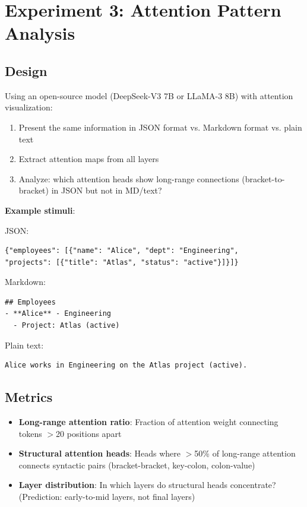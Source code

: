 \documentclass[11pt,a4paper]{article}
\begin{document}
\section{Experiment 3: Attention Pattern Analysis}

\subsection{Design}

Using an open-source model (DeepSeek-V3 7B or LLaMA-3 8B) with attention visualization:

\begin{enumerate}
    \item Present the same information in JSON format vs. Markdown format vs. plain text
    \item Extract attention maps from all layers
    \item Analyze: which attention heads show long-range connections (bracket-to-bracket) in JSON but not in MD/text?
\end{enumerate}

\textbf{Example stimuli}:

JSON:
\begin{lstlisting}
{"employees": [{"name": "Alice", "dept": "Engineering",
"projects": [{"title": "Atlas", "status": "active"}]}]}
\end{lstlisting}

Markdown:
\begin{lstlisting}
## Employees
- **Alice** - Engineering
  - Project: Atlas (active)
\end{lstlisting}

Plain text:
\begin{lstlisting}
Alice works in Engineering on the Atlas project (active).
\end{lstlisting}

\subsection{Metrics}

\begin{itemize}
    \item \textbf{Long-range attention ratio}: Fraction of attention weight connecting tokens $>$20 positions apart
    \item \textbf{Structural attention heads}: Heads where $>$50\% of long-range attention connects syntactic pairs (bracket-bracket, key-colon, colon-value)
    \item \textbf{Layer distribution}: In which layers do structural heads concentrate? (Prediction: early-to-mid layers, not final layers)
\end{itemize}
\end{document}
